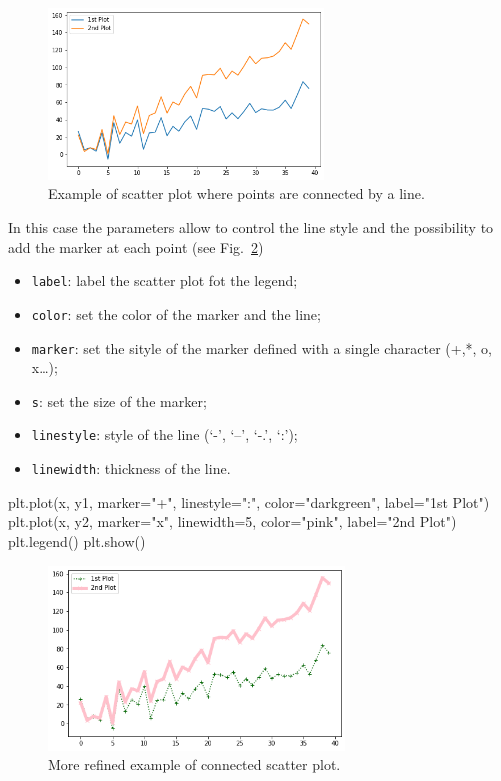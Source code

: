 \begin{figure}[htb]
	\centering
	\includegraphics[width=0.65\textwidth]{figures/plot1}
	\caption{Example of scatter plot where points are connected by a line.}
	\label{fig:plot1}
\end{figure}

In this case the parameters allow to control the line style and the possibility to add the marker at each point (see Fig.~\ref{fig:plot2})

\begin{itemize}
\tightlist
\item \texttt{label}: label the scatter plot fot the legend;
\item \texttt{color}: set the color of the marker and the line;
\item \texttt{marker}: set the sityle of the marker defined with a single character (+,*, o, x\ldots{});
\item \texttt{s}: set the size of the marker;
\item \texttt{linestyle}: style of the line (`-', `--', `-.', `:');
\item \texttt{linewidth}: thickness of the line.
\end{itemize}

\begin{ipython}
plt.plot(x, y1, marker="+", linestyle=":", color="darkgreen", label="1st Plot")
plt.plot(x, y2, marker="x", linewidth=5, color="pink", label="2nd Plot")
plt.legend()
plt.show()
\end{ipython}

\begin{figure}[htb]
	\centering
	\includegraphics[width=0.7\textwidth]{figures/plot2}
	\caption{More refined example of connected scatter plot.}
	\label{fig:plot2}
\end{figure}


